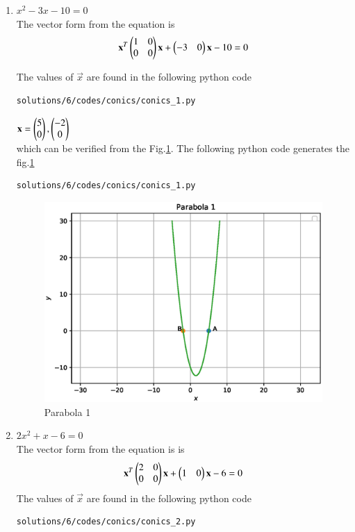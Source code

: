 \begin{enumerate}

\item $x^2-3x-10=0$  \\
The vector form from the equation is 
\begin{align}
\mathbf{x}^T\begin{pmatrix}1&0\\0&0\end{pmatrix}\mathbf{x}+\begin{pmatrix}-3&0\end{pmatrix}\mathbf{x}-10=0
\end{align}

The values of $\vec{x}$ are found in the following python code
\begin{lstlisting}
solutions/6/codes/conics/conics_1.py
\end{lstlisting}

$\mathbf{x}=\begin{pmatrix}5\\0\end{pmatrix}, \begin{pmatrix}-2\\0\end{pmatrix}$ \\
which can be verified from the Fig.\ref{fig:5.2.6_parabola_1}.
The following python code generates the fig.\ref{fig:5.2.6_parabola_1}
\begin{lstlisting}
solutions/6/codes/conics/conics_1.py
\end{lstlisting}
\begin{figure}[!ht]
\includegraphics[width=\columnwidth]{./solutions/6/codes/conics/conics_1.eps}
\caption{Parabola 1}
\label{fig:5.2.6_parabola_1}
\end{figure} 

\item $2x^2+x-6=0$ \\
The vector form from the equation is is
\begin{align}
\mathbf{x}^T\begin{pmatrix}2&0\\0&0\end{pmatrix}\mathbf{x}+\begin{pmatrix}1&0\end{pmatrix}\mathbf{x}-6
=0
\end{align}
The values of $\vec{x}$ are found in the following python code
\begin{lstlisting}
solutions/6/codes/conics/conics_2.py
\end{lstlisting}


\end{enumerate}
